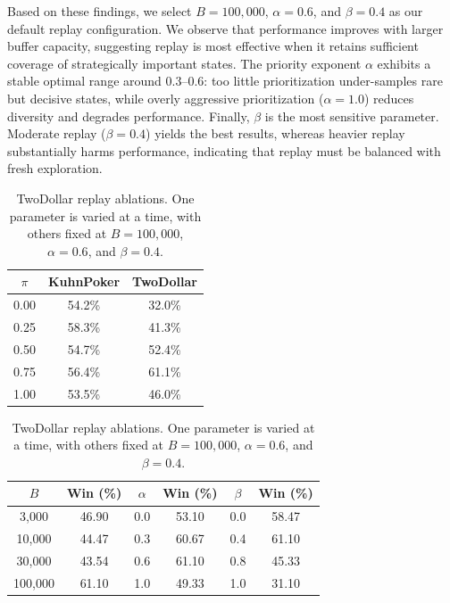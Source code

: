 Based on these findings, we select $B=100{,}000$, $\alpha=0.6$, and $\beta=0.4$ as our default replay configuration. We observe that performance improves with larger buffer capacity, suggesting replay is most effective when it retains sufficient coverage of strategically important states. The priority exponent $\alpha$ exhibits a stable optimal range around $0.3$--$0.6$: too little prioritization under-samples rare but decisive states, while overly aggressive prioritization ($\alpha=1.0$) reduces diversity and degrades performance. Finally, $\beta$ is the most sensitive parameter. Moderate replay ($\beta=0.4$) yields the best results, whereas heavier replay substantially harms performance, indicating that replay must be balanced with fresh exploration.


\begin{table}[!ht]
    \centering
\begin{minipage}[t]{.48\textwidth}
\centering
   \footnotesize
    \begin{tabular}{ccc}
        \toprule
        \textbf{$\pi$} & \textbf{KuhnPoker} & \textbf{TwoDollar} \\
        \midrule
        0.00 & 54.2\% & 32.0\% \\
        0.25 & 58.3\% & 41.3\% \\
        0.50 & 54.7\% & 52.4\% \\
        0.75 & 56.4\% & 61.1\% \\
        1.00 & 53.5\% & 46.0\% \\
        \bottomrule
    \end{tabular} 
    \caption{Ablation study on TwoDollar and KuhnPoker with varying $\pi$ while holding $B=100{,}000$, $\alpha=0.6$, and $\beta=0.4$ constant.\label{tab:pi-ablation}}
\end{minipage}\hfill
\begin{minipage}[t]{.48\textwidth}
\centering
   \footnotesize
    \setlength{\tabcolsep}{3pt}
    \renewcommand{\arraystretch}{1.25}
    \begin{tabular}{cc|cc|cc}
        \toprule
        \textbf{$B$} & \textbf{Win (\%)} &
        \textbf{$\alpha$} & \textbf{Win (\%)} &
        \textbf{$\beta$} & \textbf{Win (\%)} \\
        \midrule
        3{,}000   & 46.90 & 0.0 & 53.10 & 0.0 & 58.47 \\
        10{,}000  & 44.47 & 0.3 & 60.67 & 0.4 & 61.10 \\
        30{,}000  & 43.54 & 0.6 & 61.10 & 0.8 & 45.33 \\
        100{,}000 & 61.10 & 1.0 & 49.33 & 1.0 & 31.10 \\
        \bottomrule
    \end{tabular}
    \caption{TwoDollar replay ablations. One parameter is varied at a time, with others fixed at $B=100{,}000$, $\alpha=0.6$, and $\beta=0.4$.\label{tab:replay-ablations}}
\end{minipage}
\end{table}


